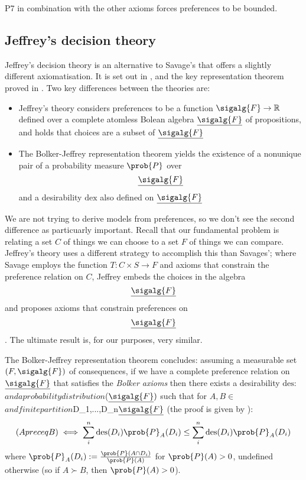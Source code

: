 P7 in combination with the other axioms forces preferences to be bounded.

\subsection{Jeffrey's decision theory}

Jeffrey's decision theory is an alternative to Savage's that offers a slightly different axiomatisation. It is set out in \citet{jeffrey_logic_1990}, and the key representation theorem proved in \citet{bolker_functions_1966}. Two key differences between the theories are:
\begin{itemize}
    \item Jeffrey's theory considers preferences to be a function $\sigalg{F}\to \mathbb{R}$ defined over a complete atomless Bolean algebra $\underline{\sigalg{F}}$ of propositions, and holds that choices are a subset of $\underline{\sigalg{F}}$
    \item The Bolker-Jeffrey representation theorem yields the existence of a nonunique pair of a probability measure $\prob{P}$ over $$\underline{\sigalg{F}}$$ and a desirability $\mathrm{dex}$ also defined on $\underline{\sigalg{F}}$
\end{itemize}

We are not trying to derive models from preferences, so we don't see the second difference as particuarly important. Recall that our fundamental problem is relating a set $C$ of things we can choose to a set $F$ of things we can compare. Jeffrey's theory uses a different strategy to accomplish this than Savages'; where Savage employs the function $T:C\times S\to F$ and axioms that constrain the preference relation on $C$, Jeffrey embeds the choices in the algebra $$\underline{\sigalg{F}}$$ and proposes axioms that constrain preferences on $$\underline{\sigalg{F}}$$. The ultimate result is, for our purposes, very similar.

The Bolker-Jeffrey representation theorem concludes: assuming a measurable set $(F,\sigalg{F})$ of consequences, if we have a complete preference relation on $\underline{\sigalg{F}}$ that satisfies the \emph{Bolker axioms} then there exists a desirability $\text{des}:$\underline{}\to{}$ and a probability distribution $\in \Delta($\underline{\sigalg{F}})$ such that for $A,B\in $\underline{}$ and finite partition $D_1,...,D_n\in $\underline{\sigalg{F}}$ (the proof is given by \citet{bolker_functions_1966}):
\begin{align}
    (A preceq B) \iff \sum_{i}^n \text{des}(D_i) \prob{P}_A(D_i) \leq \sum_{i}^n \text{des}(D_i) \prob{P}_A(D_i) \label{eq:ev_dec_theory}
\end{align}
where $\prob{P}_A(D_i):=\frac{\prob{P}(A\cap D_i)}{\prob{P}(A)}$ for $\prob{P}(A)>0$, undefined otherwise (so if $A\succ B$, then $\prob{P}(A)>0$).

